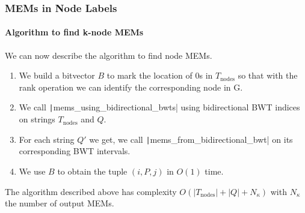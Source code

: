 \begin{frame}[fragile]
	\frametitle{MEMs in Node Labels}
	\framesubtitle{Algorithm to find k-node MEMs}
	We can now describe the algorithm to find node MEMs.
	\begin{enumerate}
		 \item We build a bitvector \(B\) to mark the location of 0s in \(T_{\text{nodes}}\)
		so that with the rank operation we can identify the corresponding node in G.
		\onslide<3-6>\item We call \texttt|mems_using_bidirectional_bwts|
		using bidirectional BWT indices on strings \(T_{\text{nodes}}\) and \(Q\).
		\onslide<4-6>\item For each string \(Q'\) we get, we call
		\texttt|mems_from_bidirectional_bwt| on its corresponding BWT intervals.
		\onslide<5-6>\item We use \(B\) to obtain the tuple \((i, P, j)\) in \(O(1)\) time.
	\end{enumerate}
	The algorithm described above has complexity
	\(O(|T_{\text{nodes}}| + |Q| + N_{\kappa})\) with \(N_{\kappa}\) the number of output MEMs.
\end{frame}